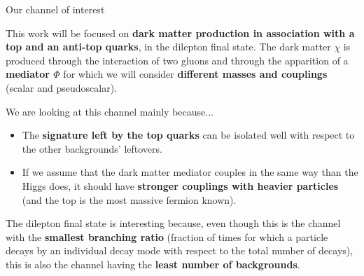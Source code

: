 \documentclass[handout,8 pt]{beamer}
\begin{document}
\begin{frame}{Our channel of interest}

	\justifying
	This work will be focused on \textbf{dark matter production in association with a top and an anti-top quarks}, in the dilepton final state. The dark matter $\chi$ is produced through the interaction of two gluons and through the apparition of a \textbf{mediator $\Phi$} for which we will consider \textbf{different masses and couplings} (scalar and pseudoscalar). \\ \vspace{8pt} \vfill
	
	\begin{minipage}[c]{.39\linewidth}
   	\end{minipage} \hfill
   	\begin{minipage}[c]{.59\linewidth}
	\justifying
	\color{mycolor} We are looking at this channel mainly because... \color{black} 
	\begin{itemize}
	\justifying
	\item The \textbf{signature left by the top quarks} can be isolated well with respect to the other backgrounds' leftovers. \vfill
	\item If we assume that the dark matter mediator couples in the same way than the Higgs does, it should have \textbf{stronger couplings with heavier particles} (and the top is the most massive fermion known). \vfill
	\end{itemize}
   	\end{minipage} \hfill \vfill	
	
	\vspace{8pt}
	
	The dilepton final state is interesting because, even though this is the channel with the \textbf{smallest branching ratio} (fraction of times for which a particle decays by an individual decay mode with respect to the total number of decays), this is also the channel having the \textbf{least number of backgrounds}. \vfill

\end{frame}
\end{document}
